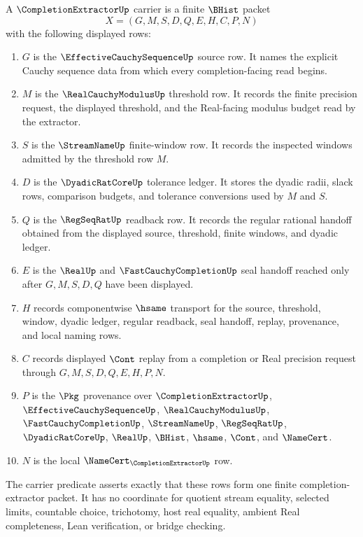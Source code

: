 \begin{definition}\label{def:completion-extractor-carrier}
A $\CompletionExtractorUp$ carrier is a finite $\BHist$ packet
$$
X=(G,M,S,D,Q,E,H,C,P,N)
$$
with the following displayed rows:
\begin{enumerate}
\item $G$ is the $\EffectiveCauchySequenceUp$ source row. It names the explicit Cauchy sequence data from which every completion-facing read begins.
\item $M$ is the $\RealCauchyModulusUp$ threshold row. It records the finite precision request, the displayed threshold, and the Real-facing modulus budget read by the extractor.
\item $S$ is the $\StreamNameUp$ finite-window row. It records the inspected windows admitted by the threshold row $M$.
\item $D$ is the $\DyadicRatCoreUp$ tolerance ledger. It stores the dyadic radii, slack rows, comparison budgets, and tolerance conversions used by $M$ and $S$.
\item $Q$ is the $\RegSeqRatUp$ readback row. It records the regular rational handoff obtained from the displayed source, threshold, finite windows, and dyadic ledger.
\item $E$ is the $\RealUp$ and $\FastCauchyCompletionUp$ seal handoff reached only after $G,M,S,D,Q$ have been displayed.
\item $H$ records componentwise $\hsame$ transport for the source, threshold, window, dyadic ledger, regular readback, seal handoff, replay, provenance, and local naming rows.
\item $C$ records displayed $\Cont$ replay from a completion or Real precision request through $G,M,S,D,Q,E,H,P,N$.
\item $P$ is the $\Pkg$ provenance over $\CompletionExtractorUp$, $\EffectiveCauchySequenceUp$, $\RealCauchyModulusUp$, $\FastCauchyCompletionUp$, $\StreamNameUp$, $\RegSeqRatUp$, $\DyadicRatCoreUp$, $\RealUp$, $\BHist$, $\hsame$, $\Cont$, and $\NameCert$.
\item $N$ is the local $\NameCert_{\CompletionExtractorUp}$ row.
\end{enumerate}
The carrier predicate asserts exactly that these rows form one finite completion-extractor packet. It has no coordinate for quotient stream equality, selected limits, countable choice, trichotomy, host real equality, ambient Real completeness, Lean verification, or bridge checking.
\end{definition}

